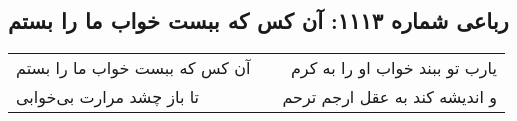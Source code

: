 \begin{center}
\section*{رباعی شماره ۱۱۱۳: آن کس که ببست خواب ما را بستم}
\label{sec:1113}
\begin{longtable}{l p{0.5cm} r}
آن کس که ببست خواب ما را بستم
&&
یارب تو ببند خواب او را به کرم
\\
تا باز چشد مرارت بی‌خوابی
&&
و اندیشه کند به عقل ارجم ترحم
\\
\end{longtable}
\end{center}
